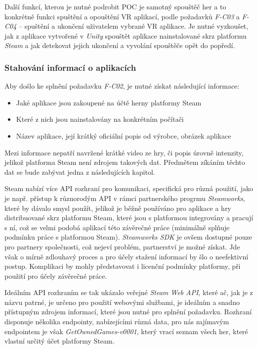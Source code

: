 Další funkcí, kterou je nutné podrobit POC je samotný spouštěč her a to
konkrétně funkci spuštění a opouštění VR aplikací, podle požadavků
\emph{F-C03} a \emph{F-C04} -- spuštění a ukončení uživatelem vybrané VR
aplikace. Je nutné vyzkoušet, jak z aplikace vytvořené v \emph{Unity}
spouštět aplikace nainstalované skrz platformu \emph{Steam} a jak
detekovat jejich ukončení a vyvolání spouštěče opět do popředí.

\subsubsection{Stahování informací o
aplikacích}\label{stahovuxe1nuxed-informacuxed-o-aplikacuxedch}

Aby došlo ke splnění požadavku \emph{F-C02}, je nutné získat následující
informace:

\begin{itemize}
\tightlist
\item
  Jaké aplikace jsou zakoupené na účtě herny platformy Steam
\item
  Které z nich jsou nainstalovány na konkrétním počítači
\item
  Název aplikace, její krátký oficiální popis od výrobce, obrázek
  aplikace
\end{itemize}

Mezi informace nepatří navržené krátké video ze hry, či popis úrovně
intenzity, jelikož platforma Steam není zdrojem takových dat. Předmětem
zíkáním těchto dat se bude zabývat jedna z následujících kapitol.

Steam nabízí více API rozhraní pro komunikaci, specifická pro různá
použití, jako je např. přístup k různorodým API v rámci partnerského
progrmu \emph{Steamworks}, které by dávalo smysl použít, jelikož je
běžně používáno pro aplikace a hry distribuované skrz platformu Steam,
které jsou s platformou integrovány a pracují s ní, což se velmi podobá
aplikací této závěrečné práce (minimálně splňuje podmínku práce s
platformou Steam). \emph{Steamworks SDK} je ovšem dostupné pouze pro
partnery společnosti, což nejeví problém, partnerství je možné získat.
Jde však o mírně zdlouhavý proces a pro účely stažení informací by šlo o
neefektivní postup. Komplikaci by mohly představovat i licenční podmínky
platformy, při použití pro účely závěrečné práce.

Ideálním API rozhraním se tak ukázalo veřejné \emph{Steam Web API},
které ač, jak je z názvu patrné, je určeno pro použití webovými
službami, je ideálním a snadno přístupným zdrojem informací, které jsou
nutné pro splnění požadavku. Rozhraní disponuje několika endpointy,
nabízejícími různá data, pro nás zajímavým endpointem je však
\emph{GetOwnedGames-v0001}, který vrací seznam všech her, které vlastní
určitý účet platformy Steam.

